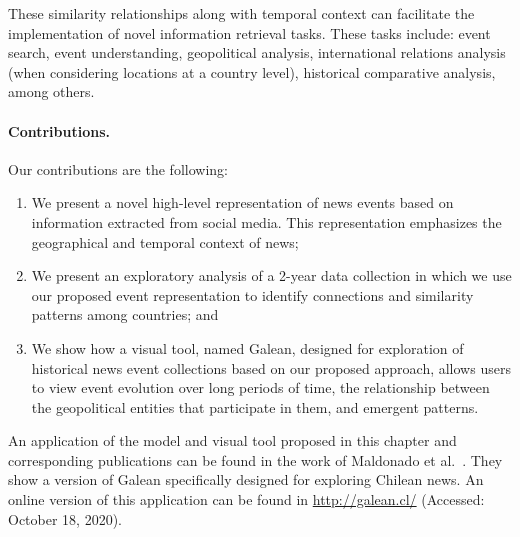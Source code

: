 These similarity relationships along with temporal context can facilitate the
implementation of novel information retrieval tasks. 
%
These tasks include: event search, event understanding, geopolitical analysis,
international relations analysis (when considering locations at a country
level), historical comparative analysis, among others.

\paragraph{Contributions.} Our contributions are the following:

\begin{enumerate}
\item We present a novel high-level representation of news events based on
information extracted from social media. This representation emphasizes the
geographical and temporal context of news;
\item We present an exploratory analysis of a 2-year data collection in which we
use our proposed event representation to identify connections and similarity
patterns among countries; and
\item We show how a visual tool, named Galean, designed for exploration of
historical news event collections based on our proposed approach, allows users
to view event evolution over long periods of time, the relationship between the
geopolitical entities that participate in them, and emergent patterns.
\end{enumerate}

An application of the model and visual tool proposed in this chapter and
corresponding publications can be found in the work of Maldonado et
al.~\cite{maldonado2015spatio}.
%
They show a version of Galean specifically designed for exploring Chilean news.
%
An online version of this application can be found in \url{http://galean.cl/}
(Accessed: October 18, 2020).